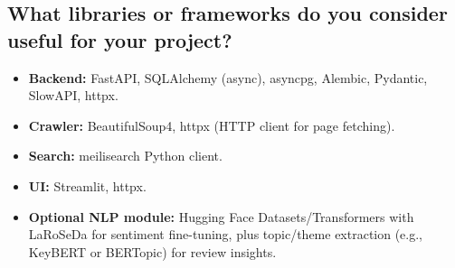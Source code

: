 \documentclass[12pt,a4paper]{article}
\begin{document}
\subsection{What libraries or frameworks do you consider useful for your project?}
\begin{itemize}[leftmargin=*]
	\item \textbf{Backend:} FastAPI, SQLAlchemy (async), asyncpg, Alembic, Pydantic, SlowAPI, httpx.
	\item \textbf{Crawler:} BeautifulSoup4, httpx (HTTP client for page fetching).
	\item \textbf{Search:} meilisearch Python client.
	\item \textbf{UI:} Streamlit, httpx.
	\item \textbf{Optional NLP module:} Hugging Face Datasets/Transformers with LaRoSeDa for sentiment fine-tuning, plus topic/theme extraction (e.g., KeyBERT or BERTopic) for review insights.
\end{itemize}
\end{document}

